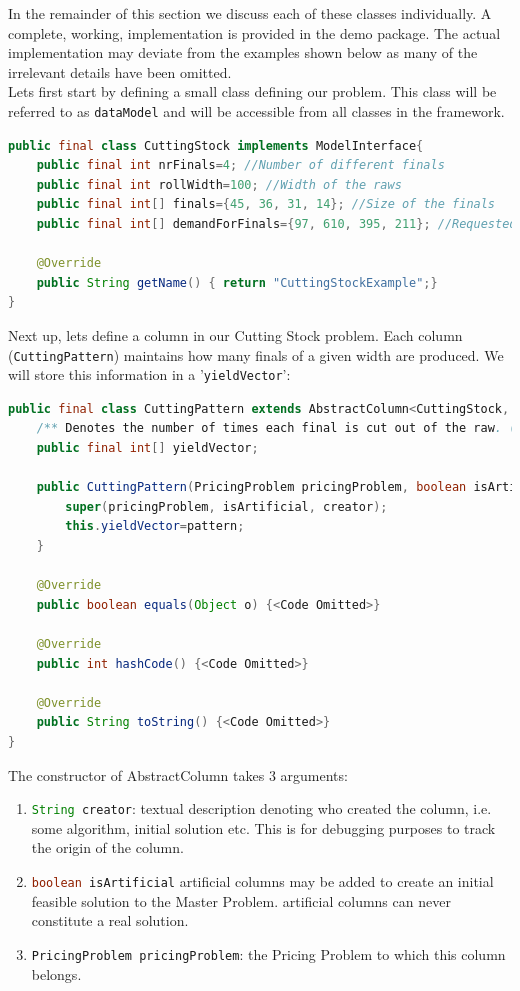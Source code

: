 \documentclass[a4paper]{article}
\newenvironment{myblock}[1]{%
    \tcolorbox[beamer,%
    noparskip,breakable,
    colback=lightBlueCodeBlock,colframe=darkBlueCodeBlock,%
    colbacklower=darkBlueCodeBlock!75!lightBlueCodeBlock,%
    coltitle=blueTitleCodeBlock,
    title=#1]}%
    {\endtcolorbox}
\newcommand{\code}[1]{\lstinline[language=java, style=seminar]!#1!}
\begin{document}
In the remainder of this section we discuss each of these classes individually. A complete, working, implementation is provided in the demo package. The actual implementation may deviate from the examples shown below as many of the irrelevant details have been omitted.\\
Lets first start by defining a small class defining our problem. This class will be referred to as \code{dataModel} and will be accessible from all classes in the framework.
\begin{myblock}{CuttingStock}
\begin{lstlisting}[language=java, style=eclipseArticle, xleftmargin=2em]  
public final class CuttingStock implements ModelInterface{
	public final int nrFinals=4; //Number of different finals
	public final int rollWidth=100; //Width of the raws
	public final int[] finals={45, 36, 31, 14}; //Size of the finals
	public final int[] demandForFinals={97, 610, 395, 211}; //Requested quantity of each final

	@Override
	public String getName() { return "CuttingStockExample";}
}
\end{lstlisting}
\end{myblock}
Next up, lets define a column in our Cutting Stock problem. Each column (\code{CuttingPattern}) maintains how many finals of a given width are produced. We will store this information in a '\code{yieldVector}':
\begin{myblock}{CuttingPattern}
\begin{lstlisting}[language=java, style=eclipseArticle, xleftmargin=2em]  
public final class CuttingPattern extends AbstractColumn<CuttingStock, PricingProblem> {
	/** Denotes the number of times each final is cut out of the raw. (vector a_j)**/
	public final int[] yieldVector;

	public CuttingPattern(PricingProblem pricingProblem, boolean isArtificial, String creator, int[] pattern) {
		super(pricingProblem, isArtificial, creator);
		this.yieldVector=pattern;
	}

	@Override
	public boolean equals(Object o) {<Code Omitted>}

	@Override
	public int hashCode() {<Code Omitted>}

	@Override
	public String toString() {<Code Omitted>}
}
\end{lstlisting}
\end{myblock}
The constructor of AbstractColumn takes 3 arguments:
\begin{enumerate}[nolistsep]
 \item \code{String creator}: textual description denoting who created the column, i.e. some algorithm, initial solution etc. This is for debugging purposes to track the origin of the column.
 \item \code{boolean isArtificial} artificial columns may be added to create an initial feasible solution to the Master Problem. artificial columns can never constitute a real solution. 
 \item \code{PricingProblem pricingProblem}: the Pricing Problem to which this column belongs. 
\end{enumerate}
\end{document}
